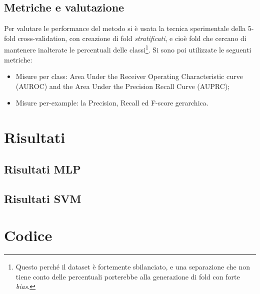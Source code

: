 \documentclass{article}
\begin{document}
\subsection{Metriche e valutazione}

Per valutare le performance del metodo si è usata la tecnica sperimentale della 5-fold
cross-validation, con creazione di fold \textit{stratificati}, e cioè fold che cercano di mantenere inalterate le percentuali delle classi\footnote{Questo perché il dataset è fortemente sbilanciato, e una separazione che non tiene conto delle percentuali porterebbe alla generazione di fold con forte \emph{bias}.}.  Si sono poi utilizzate le seguenti metriche:

\begin{itemize}
\item Misure per  class:   Area  Under  the  Receiver  Operating  Characteristic
curve (AUROC) and the Area Under the Precision Recall Curve (AUPRC);
\item Misure per-example: la Precision, Recall ed F-score gerarchica.
\end{itemize}

\section{Risultati}
\subsection{Risultati MLP}

\subsection{Risultati SVM}

\section{Codice}
\end{document}
